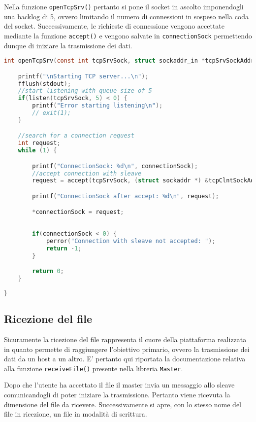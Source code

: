 \documentclass[11pt,fleqn]{book} %
\begin{document}
Nella funzione \texttt{openTcpSrv()} pertanto si pone il socket in ascolto imponendogli una backlog di 5, ovvero limitando il numero di connessioni in sospeso nella coda del socket. Successivamente, le richieste di connessione vengono accettate mediante la funzione \texttt{accept()} e vengono salvate in \texttt{connectionSock} permettendo dunque di iniziare la trasmissione dei dati.
\begin{lstlisting}[language=C]
int openTcpSrv(const int tcpSrvSock, struct sockaddr_in *tcpSrvSockAddr, const int tcpSrvSockAddrLen, struct sockaddr_in *tcpClntSockAddr, int tcpClntSockAddrLen, int *connectionSock) {

	printf("\nStarting TCP server...\n");
	fflush(stdout);
	//start listening with queue size of 5
	if(listen(tcpSrvSock, 5) < 0) {
		printf("Error starting listening\n");
		// exit(1);
	}

	//search for a connection request
	int request;
	while (1) {

		printf("ConnectionSock: %d\n", connectionSock);
		//accept connection with sleave
		request = accept(tcpSrvSock, (struct sockaddr *) &tcpClntSockAddr, &tcpClntSockAddrLen);

		printf("ConnectionSock after accept: %d\n", request);

		*connectionSock = request;
		
		
		if(connectionSock < 0) {
			perror("Connection with sleave not accepted: ");
			return -1;
		}

		return 0;
	}
	
}
\end{lstlisting}

\subsection{Ricezione del file}
Sicuramente la ricezione del file rappresenta il cuore della piattaforma realizzata in quanto permette di raggiungere l'obiettivo primario, ovvero la trasmissione dei dati da un host a un altro. E' pertanto qui riportata la documentazione relativa alla funzione \texttt{receiveFile()} presente nella libreria \texttt{Master}.

Dopo che l'utente ha accettato il file il master invia un messaggio allo sleave comunicandogli di poter iniziare la trasmissione. Pertanto viene ricevuta la dimensione del file da ricevere.
Successivamente si apre, con lo stesso nome del file in ricezione, un file in modalità di scrittura.
\end{document}
